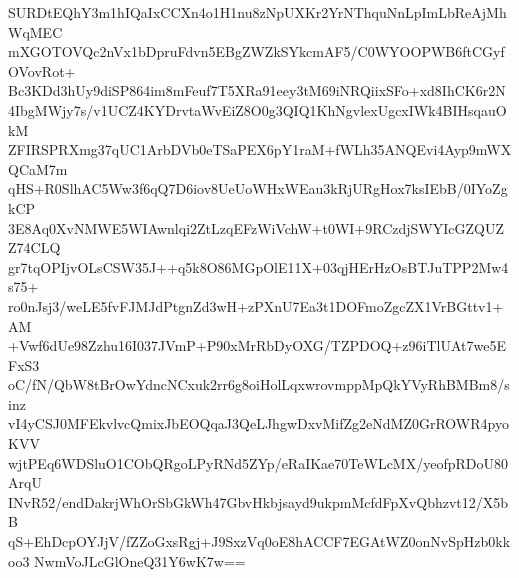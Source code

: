 SURDtEQhY3m1hIQaIxCCXn4o1H1nu8zNpUXKr2YrNThquNnLpImLbReAjMhWqMEC
mXGOTOVQc2nVx1bDpruFdvn5EBgZWZkSYkcmAF5/C0WYOOPWB6ftCGyfOVovRot+
Bc3KDd3hUy9diSP864im8mFeuf7T5XRa91eey3tM69iNRQiixSFo+xd8IhCK6r2N
4IbgMWjy7s/v1UCZ4KYDrvtaWvEiZ8O0g3QIQ1KhNgvlexUgcxIWk4BIHsqauOkM
ZFIRSPRXmg37qUC1ArbDVb0eTSaPEX6pY1raM+fWLh35ANQEvi4Ayp9mWXQCaM7m
qHS+R0SlhAC5Ww3f6qQ7D6iov8UeUoWHxWEau3kRjURgHox7ksIEbB/0IYoZgkCP
3E8Aq0XvNMWE5WIAwnlqi2ZtLzqEFzWiVchW+t0WI+9RCzdjSWYIcGZQUZZ74CLQ
gr7tqOPIjvOLsCSW35J++q5k8O86MGpOlE11X+03qjHErHzOsBTJuTPP2Mw4s75+
ro0nJsj3/weLE5fvFJMJdPtgnZd3wH+zPXnU7Ea3t1DOFmoZgcZX1VrBGttv1+AM
+Vwf6dUe98Zzhu16I037JVmP+P90xMrRbDyOXG/TZPDOQ+z96iTlUAt7we5EFxS3
oC/fN/QbW8tBrOwYdncNCxuk2rr6g8oiHolLqxwrovmppMpQkYVyRhBMBm8/sinz
vI4yCSJ0MFEkvlvcQmixJbEOQqaJ3QeLJhgwDxvMifZg2eNdMZ0GrROWR4pyoKVV
wjtPEq6WDSluO1CObQRgoLPyRNd5ZYp/eRaIKae70TeWLcMX/yeofpRDoU80ArqU
INvR52/endDakrjWhOrSbGkWh47GbvHkbjsayd9ukpmMcfdFpXvQbhzvt12/X5bB
qS+EhDcpOYJjV/fZZoGxsRgj+J9SxzVq0oE8hACCF7EGAtWZ0onNvSpHzb0kkoo3
NwmVoJLcGlOneQ31Y6wK7w==
